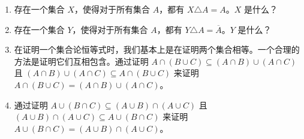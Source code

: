 \begin{enumerate}
  找出这个无限族中所有区间的并集和交集。
  \[ \bigcup_{n \in \Naturals} I_n \quad = \]
  
  \[ \bigcap_{n \in \Naturals} I_n \quad = \]
  
  
  \wbvfill
  
  \workbookpagebreak
  
  \item 
  
  存在一个集合 $X$，使得对于所有集合 $A$，都有 $X \triangle A = A$。$X$ 是什么？
  
  \wbvfill
  
  \item 
  
  存在一个集合 $Y$，使得对于所有集合 $A$，都有 $Y \triangle A = \overline{A}$。$Y$ 是什么？
  
  
  \wbvfill
  
  \workbookpagebreak
  
  \item 
  
  在证明一个集合论恒等式时，我们基本上是在证明两个集合相等。一个合理的方法是证明它们互相包含。通过证明 $A \cap (B \cup C) \subseteq (A \cap B) \cup (A \cap C)$ 且 $(A \cap B) \cup (A \cap C) \subseteq A \cap (B \cup C)$ 来证明 $A \cap (B \cup C) = (A \cap B) \cup (A \cap C)$。
  \wbvfill
  
  \workbookpagebreak
  
  \item 
  
  通过证明 $A \cup (B \cap C) \subseteq (A \cup B) \cap (A \cup C)$ 且 $(A \cup B) \cap (A \cup C) \subseteq A \cup (B \cap C)$ 来证明 $A \cup (B \cap C) = (A \cup B) \cap (A \cup C)$。
  

\end{enumerate}
